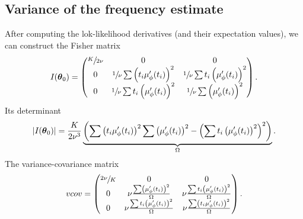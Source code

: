 
\subsection{Variance of the frequency estimate}
After computing the lok-likelihood derivatives (and their expectation values), we can construct
the Fisher matrix
\[
\Fisher = \begin{pmatrix}
  \sfrac{K}{2\nu} & 0 								& 0 \\
  0 				& \sfrac1\nu\sum\bkt{t_i\mupp}^2	& \sfrac1\nu\sum t_i\bkt{\mupp}^2 \\
  0				& \sfrac1\nu\sum t_i\bkt{\mupp}^2	&\sfrac1\nu\sum\bkt{\mupp}^2
\end{pmatrix}.
\]
Its determinant
\newcommand{\STM}{\Omega}
\[
|\Fisher| = \frac{K}{2\nu^3}\underbrace{\bkt{\sum\bkt{t_i\mupp}^2\sum\bkt{\mupp}^2 - \bkt{\sum t_i\bkt{\mupp}^2}^2}}_{\STM}.
\]
The variance-covariance matrix
\[
vcov = \begin{pmatrix}
  \sfrac{2\nu}{K}& 0									& 0				\\
  0				&\nu\frac{\sum\bkt{\mupp}^2}{\STM}		&\nu\frac{\sum t_i\bkt{\mupp}^2}{\STM}\\
  0				&\nu\frac{\sum t_i\bkt{\mupp}^2}{\STM}	&\nu\frac{\sum\bkt{t_i\mupp}^2}{\STM}
\end{pmatrix}.
\]

